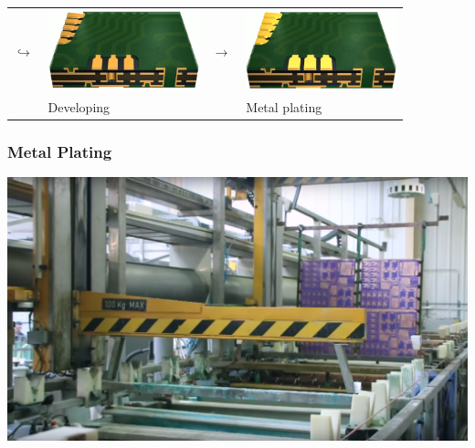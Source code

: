 \documentclass{beamer}
\begin{document}
\begin{frame}
\begin{center}
\begin{tabular}{m{0.05\linewidth} m{0.38\linewidth} m{0.05\linewidth} m{0.38\linewidth}}
			 \Large\textbf{$\hookrightarrow$} & \includegraphics[scale=0.12]{obr19_maskaHotovo.png} & \Large\textbf{$\rightarrow$} & \includegraphics[scale=0.12]{obr20_Pokoveni.png}\\
			& Developing & & Metal plating
			\end{tabular}
		\end{center}
	\end{frame}
	\begin{frame}
    \frametitle{Metal Plating}

		\begin{center}
			\includegraphics[scale=0.2]{obr22_procesProkovovani.png}
		\end{center}
		
	\end{frame}
\end{document}
